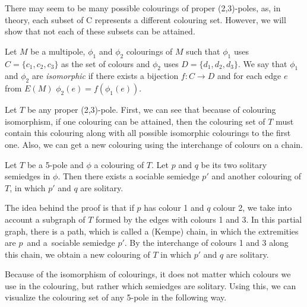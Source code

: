 There may seem to be many possible colourings of proper (2,3)-poles, as, in theory, each subset of C represents a different colouring set. However, we will show that not each of these subsets can be attained.

Let $M$ be a multipole, $\phi_1$ and $\phi_2$ colourings of $M$ such that $\phi_1$ uses $C=\{c_1,c_2,c_3\}$ as the set of colours and $\phi_2$ uses $D=\{d_1,d_2,d_3\}$. We say that $\phi_1$ and $\phi_2$ are \textit{isomorphic} if there exists a bijection $f\colon C\rightarrow D$ and for each edge $e$ from $E(M)$ $\phi_2(e)=f(\phi_1(e))$.

Let $T$ be any proper (2,3)-pole. First, we can see that because of colouring isomorphism, if one colouring can be attained, then the colouring set of $T$ must contain this colouring along with all possible isomorphic colourings to the first one. Also, we can get a new colouring using the interchange of colours on a chain.

\begin{lemma}
	Let $T$ be a 5-pole and $\phi$ a colouring of $T$. Let $p$ and $q$ be its two solitary semiedges in $\phi$. Then there exists a sociable semiedge $p'$ and another colouring of $T$, in which $p'$ and $q$ are solitary.
	\label{lem:solitary}
\end{lemma}

The idea behind the proof is that if $p$ has colour 1 and $q$ colour 2, we take into account a subgraph of $T$ formed by the edges with colours 1 and 3. In this partial graph, there is a path, which is called a (Kempe) chain, in which the extremities are $p$~and a~sociable semiedge $p'$. By the interchange of colours 1 and 3 along this chain, we obtain a new colouring of $T$ in which $p'$ and $q$ are solitary.


Because of the isomorphism of colourings, it does not matter which colours we use in the colouring, but rather which semiedges are solitary. Using this, we can visualize the colouring set of any 5-pole in the following way.

